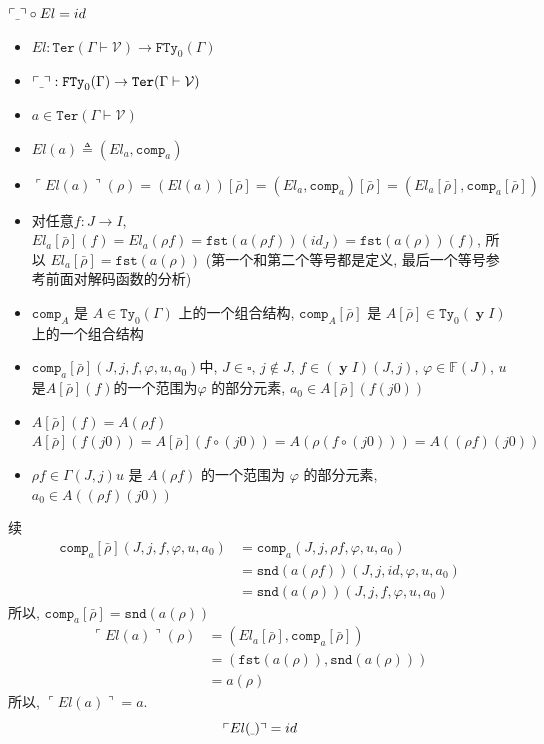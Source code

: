 \documentclass[aspectratio=169,xcolor=dvipsnames]{beamer}
\newcommand\calV{\mathcal{V}}
\newcommand\bbF{\mathbb{F}}
\newcommand\FTy{\mathtt{FTy}}
\newcommand\comp{\mathtt{comp}}
\newcommand\fst{\mathtt{fst}}
\newcommand\snd{\mathtt{snd}}
\newcommand\Ty{\mathtt{Ty}}
\newcommand\Ter{\mathtt{Ter}}
\newcommand{\ul}{{\scalebox{0.4}[1.0]{\_}}}
\DeclareMathOperator\y{\mathbf{y}}
\begin{document}
\begin{frame}[shrink]{$\ulcorner\ul\urcorner\circ El = id$}
  \begin{itemize}
    \item $El: \Ter(\Gamma\vdash\calV) \to \FTy_{0}(\Gamma)$
    \item $\ulcorner\ul\urcorner : \FTy_{0}(\Gamma) \to \Ter(\Gamma\vdash\calV)$
    \item $a \in \Ter(\Gamma\vdash\calV)$
    \item $El(a)\triangleq(El_{a},\comp_{a})$
    \item $\ulcorner El(a)\urcorner(\rho) = (El(a))[\bar{\rho}]=(El_a,\comp_{a})[\bar{\rho}]=(El_a[\bar{\rho}],\comp_{a}[\bar{\rho}])$
    \item 对任意$f:J\to I$, $El_a[\bar{\rho}](f) = El_a(\rho f)=\fst(a(\rho f))(id_J) = \fst(a(\rho))(f)$, 所以 $El_a[\bar{\rho}] = \fst(a(\rho))$ (第一个和第二个等号都是定义, 最后一个等号参考前面对解码函数的分析)
    \item $\comp_A$ 是 $A\in\Ty_{0}(\Gamma)$ 上的一个组合结构, $\comp_A[\bar{\rho}]$ 是 $A[\bar{\rho}]\in\Ty_{0}(\y I)$ 上的一个组合结构
    \item $\comp_a[\bar{\rho}](J,j,f,\varphi,u,a_0)$中, $J\in\square$, $j\notin J$, $f\in (\y I)(J,j)$, $\varphi\in\bbF(J)$, $u$ 是$A[\bar{\rho}](f)$的一个范围为$\varphi$ 的部分元素, $a_0\in A[\bar{\rho}](f(j0))$
    \item $A[\bar{\rho}](f)=A(\rho f)$\qquad$A[\bar{\rho}](f(j0))=A[\bar{\rho}](f\circ (j0))=A(\rho(f\circ(j0)))=A((\rho f)(j0))$
    \item $\rho f\in \Gamma(J,j)$\quad $u$ 是 $A(\rho f)$ 的一个范围为 $\varphi$ 的部分元素, $a_0\in A((\rho f)(j0))$
  \end{itemize}
\end{frame}
\begin{frame}[shrink]{续}
  \begin{align*}
  \comp_a[\bar{\rho}](J,j,f,\varphi,u,a_0) &= \comp_a(J,j,\rho f,\varphi,u,a_0) \\
  &=\snd(a(\rho f))(J,j,id,\varphi,u,a_0) \\
  &=\snd(a(\rho))(J,j,f,\varphi,u,a_0)
  \end{align*}
  所以, $\comp_a[\bar{\rho}] = \snd(a(\rho))$
  \begin{align*}
  \ulcorner El(a)\urcorner(\rho) &= (El_a[\bar{\rho}],\comp_{a}[\bar{\rho}]) \\
  &= (\fst(a(\rho)),\snd(a(\rho)))\\
  &=a(\rho)
  \end{align*}
  所以, $\ulcorner El(a)\urcorner = a$.
  \[ \ulcorner El(\ul) \urcorner = id \]
\end{frame}
\end{document}
